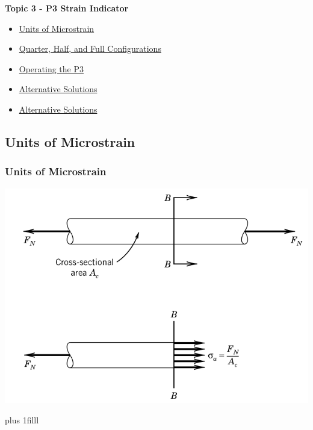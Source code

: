 \documentclass[fleqn]{beamer} %
\newcommand{\sectionIIItitle}{P3 Strain Indicator}
\newcommand{\sectionIIIsubsectionItitle}{Units of Microstrain}
\newcommand{\sectionIIIsubsectionIItitle}{Quarter, Half, and Full Configurations}
\newcommand{\sectionIIIsubsectionIIItitle}{Operating the P3}
\newcommand{\sectionIIIsubsectionIVtitle}{Alternative Solutions}
\newcommand{\btVFill}{\vskip0pt plus 1filll}
\begin{document}
		\begin{frame}
			\large \textbf{Topic 3 - \sectionIIItitle} \vspace{3mm}\\

			\begin{itemize}
				\item \hyperlink{sectionIIIsubsectionI}{\sectionIIIsubsectionItitle} \vspc %
				\item \hyperlink{sectionIIIsubsectionII}{\sectionIIIsubsectionIItitle} \vspc %
				\item \hyperlink{sectionIIIsubsectionIII}{\sectionIIIsubsectionIIItitle} \vspc %
				\item \hyperlink{sectionIIIsubsectionIV}{\sectionIIIsubsectionIVtitle} \vspc %
				\item \hyperlink{sectionIIIsubsectionV}{\sectionIIIsubsectionIVtitle} \vspc %
			\end{itemize}

		\end{frame}

		\subsection{\sectionIIIsubsectionItitle}\label{sectionIIIsubsectionI}

			\begin{frame}
				\frametitle{\sectionIIIsubsectionItitle}

				\bigskip

				\includegraphics[scale=.25]{images/strain_fig1.png}
			
				\btVFill
			

			\end{frame}
\end{document}
